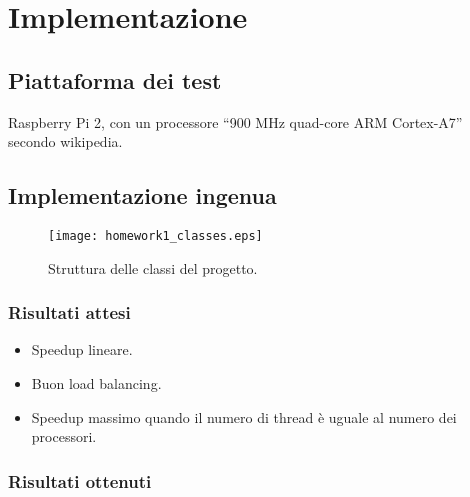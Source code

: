 \documentclass[]{myarticle}
\begin{document}
\section{Implementazione}

\subsection{Piattaforma dei test}

Raspberry Pi 2, con un processore ``900 MHz quad-core ARM Cortex-A7'' secondo wikipedia.

\subsection{Implementazione ingenua}

\begin{figure*}[th]
	\centering
	\texttt{[image: homework1\_classes.eps]}
	\caption{Struttura delle classi del progetto.}
\end{figure*}


\subsubsection{Risultati attesi}

\begin{itemize}
	\item Speedup lineare.
	\item Buon load balancing.
	\item Speedup massimo quando il numero di thread \`e uguale al numero dei processori.
\end{itemize}

\subsubsection{Risultati ottenuti}



\end{document}
